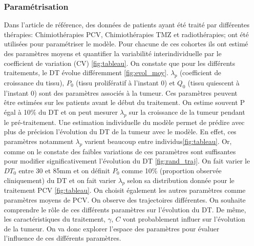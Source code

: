 \documentclass[12pt]{article}
\begin{document}
\subsubsection{Paramétrisation}
Dans l'article de référence, des données de patients ayant été traité par différentes thérapies: Chimiothérapies PCV, Chimiothérapies TMZ et radiothérapies; ont été utilisées pour paramétriser le modèle. Pour chacune de ces cohortes ils ont estimé des paramètres moyens et quantifier la variabilité interindividuelle par le coefficient de variation (CV) \ref{fig:tableau}.  On constate que pour les différents traitements, le DT évolue différemment \ref{fig:evol_moy}. $\lambda_{p}$ (coefficient de croissance du tissu), $P_{0}$ (tissu prolifératif à l'instant 0) et $Q_{0}$ (tissu quiescent à l'instant 0) sont des paramètres associés à la tumeur.  Ces paramètres peuvent être estimées sur les patients avant le début du traitement. On estime souvent P égal à 10\% du DT et on peut mesurer $\lambda_{p}$ sur la croissance de la tumeur pendant le pré-traitement. Une estimation individuelle du modèle permet de prédire avec plus de précision l'évolution du DT de la tumeur avec le modèle. En effet, ces paramètres notamment $\lambda_{p}$ varient beaucoup entre individus\ref{fig:tableau}. Or, comme on le constate des faibles variations de ces paramètres sont suffisantes pour modifier significativement  l'évolution du DT \ref{fig:rand_traj}. On fait varier le $DT_{0}$ entre 30 et 85mm et on définit $P_{0}$ comme 10\% (proportion observée cliniquement) du DT et on fait varier $\lambda_{p}$ selon sa distribution donnée pour le traitement PCV \ref{fig:tableau}. On choisit également les autres paramètres comme paramètres moyens de PCV. On observe des trajectoires différentes.  On  souhaite comprendre le rôle de ces différents paramètres sur l'évolution du DT. De même, les caractéristiques du traitement, $\gamma$, $C$ vont probablement influer sur l'évolution de la tumeur. On va donc explorer l'espace des paramètres pour évaluer l'influence de ces différents paramètres.  
\end{document}
